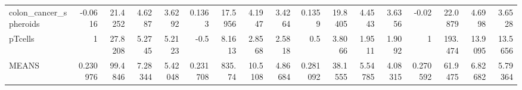\begin{tabular}{lrrrrrrrrrrrrrrrr}
 colon\_cancer\_spheroids                      &             -0.0616   &          21.4252 &           4.6287  &          3.6292  &         0.1363   &     17.5956 &       4.1947 &     3.4264  &       0.1359   &   19.8405 &    4.4543  &   3.6356  &        -0.02     &     22.0879 &      4.6998  &     3.6528  \\
 pTcells                                     &              1        &          27.8208 &           5.2745  &          5.2123  &        -0.5      &      8.1613 &       2.8568 &     2.5818  &       0.5      &    3.8066 &    1.9511  &   1.9092  &         1        &    193.474  &     13.9095  &    13.5656  \\
 MEANS                                       &              0.230976 &          99.4846 &           7.28344 &          5.42048 &         0.231708 &    835.74   &      10.5108 &     4.86684 &       0.281092 &   38.1555 &    5.54785 &   4.08315 &         0.270592 &     61.9475 &      6.82682 &     5.79364 \\
\hline
\end{tabular}